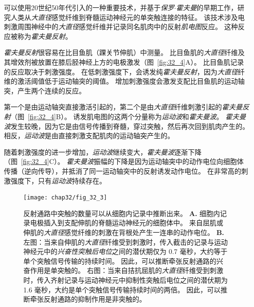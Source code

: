\begin{proposition}[霍夫曼反射] \label{box:32_3}
	
	\quad \quad 可以使用20世纪50年代引入的一种重要技术，并基于\textit{保罗$\cdot$霍夫曼}的早期工作，研究人类从\textit{大直径}感觉纤维到脊髓运动神经元的单突触连接的特征。
	该技术涉及电刺激周围神经中的\textit{大直径}感觉纤维并记录同名肌肉中的反射\textit{肌电图}反应。
	这种反应被称为\textit{霍夫曼反射}。
	
	\quad \quad \textit{霍夫曼反射}很容易在比目鱼肌（踝关节伸肌）中测量。
	比目鱼肌的\textit{大直径}纤维及其增效剂被放置在膝后胫神经上方的电极激发（图~\ref{fig:32_4}A）。
	比目鱼肌记录的反应取决于刺激强度。
	在低刺激强度下，会诱发纯\textit{霍夫曼反射}，因为\textit{大直径}纤维的激活阈值低于运动轴突的阈值。
	增加刺激强度会激发支配比目鱼肌的运动轴突，产生两个连续的反应。
	
	\quad \quad 第一个是由运动轴突直接激活引起的，第二个是由\textit{大直径}纤维刺激引起的\textit{霍夫曼反射}（图~\ref{fig:32_4}B）。
	诱发肌电图的这两个分量称为\textit{运动波}和\textit{霍夫曼波}。
	\textit{霍夫曼波}发生较晚，因为它是由信号传播到脊髓，穿过突触，然后再次回到肌肉产生的。
	相反，\textit{运动波}是由直接刺激支配肌肉的运动轴突产生的。
	
	\quad \quad 随着刺激强度的进一步增加，\textit{运动波}继续变大，\textit{霍夫曼波}逐渐下降（图~\ref{fig:32_4}C）。
	\textit{霍夫曼波}振幅的下降是因为运动轴突中的动作电位向细胞体传播（逆向传导），并抵消了同一运动轴突中的反射诱发动作电位。
	在非常高的刺激强度下，只有\textit{运动波}持续存在。
	
\end{proposition}


\begin{figure}[htbp]
	\centering
	\texttt{[image: chap32/fig\_32\_3]}
	\caption{反射通路中突触的数量可以从细胞内记录中推断出来。
		\textbf{A.} 细胞内记录电极插入到支配伸肌的脊髓运动神经元的细胞体中。
		来自屈肌或伸肌的\textit{大直径}感觉纤维的刺激在背根处产生一连串的动作电位。
		\textbf{B.} 左图：当来自伸肌的\textit{大直径}纤维受到刺激时，传入截击的记录与运动神经元中的\textit{兴奋性突触后电位}之间的潜伏期仅为 0.7 毫秒，大约等于单个突触信号传输的持续时间。
		因此，可以推断牵张反射通路的兴奋作用是单突触的。
		右图：当来自拮抗屈肌的\textit{大直径}纤维受到刺激时，传入齐射记录与运动神经元中抑制性突触后电位之间的潜伏期为 1.6 毫秒，大约是单个突触信号传输持续时间的两倍。
		因此，可以推断牵张反射通路的抑制作用是非突触的。}
	\label{fig:32_3}
\end{figure}



